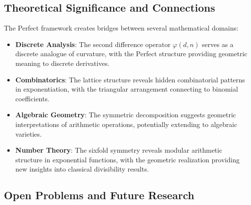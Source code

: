 \documentclass[11pt]{article}
\begin{document}
\subsection{Theoretical Significance and Connections}

The Perfect framework creates bridges between several mathematical domains:

\begin{itemize}
\item \textbf{Discrete Analysis}: The second difference operator $\varphi(d,n)$ serves as a discrete analogue of curvature, with the Perfect structure providing geometric meaning to discrete derivatives.

\item \textbf{Combinatorics}: The lattice structure reveals hidden combinatorial patterns in exponentiation, with the triangular arrangement connecting to binomial coefficients.

\item \textbf{Algebraic Geometry}: The symmetric decomposition suggests geometric interpretations of arithmetic operations, potentially extending to algebraic varieties.

\item \textbf{Number Theory}: The sixfold symmetry reveals modular arithmetic structure in exponential functions, with the geometric realization providing new insights into classical divisibility results.
\end{itemize}

\subsection{Open Problems and Future Research}
\end{document}
